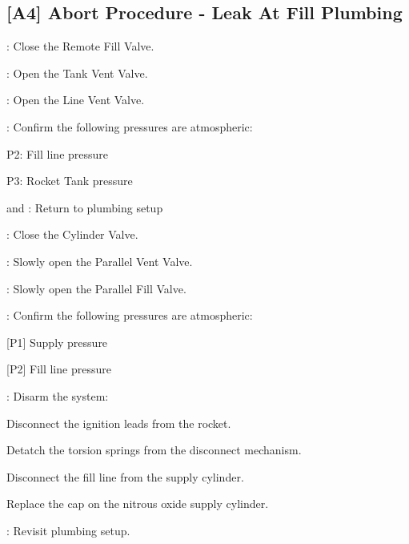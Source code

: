 \begin{checklist}
\subsection{[A4] Abort Procedure - Leak At Fill Plumbing}
\begin{checklist}
    \item \control{}: Close the Remote Fill Valve.
    \item \control{}: Open the Tank Vent Valve.
    \item \control{}: Open the Line Vent Valve.
    \item \control{}: Confirm the following pressures are atmospheric:
    \begin{checklist}
        \item P2: Fill line pressure
        \item P3: Rocket Tank pressure
    \end{checklist}
    \item \primary{} and \secondary{}: Return to plumbing setup
    \item \primary{}: Close the Cylinder Valve.
    \item \primary{}: Slowly open the Parallel Vent Valve.
    \item \primary{}: Slowly open the Parallel Fill Valve.
    \item \control{}: Confirm the following pressures are atmospheric:
    \begin{checklist}
        \item {[P1]} Supply pressure
        \item {[P2]} Fill line pressure
    \end{checklist}
    \item \primary{}: Disarm the system:
        \begin{checklist}    
            \item Disconnect the ignition leads from the rocket.
            \item Detatch the torsion springs from the disconnect mechanism.
            \item Disconnect the fill line from the supply cylinder.
            \item Replace the cap on the nitrous oxide supply cylinder.
        \end{checklist}
    \item \ops{}: Revisit plumbing setup.
\end{checklist}
\setcounter{checklistnum}{0}


\end{checklist}
